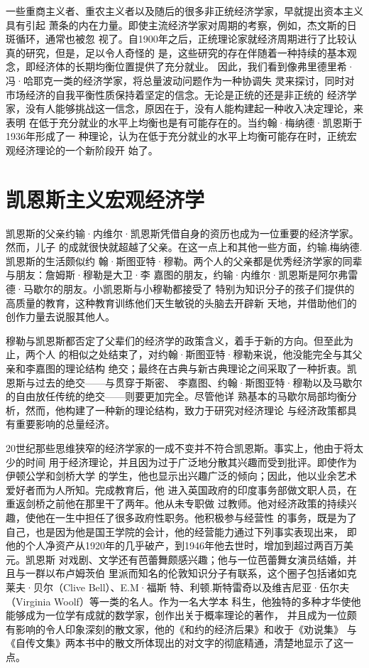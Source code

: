 一些重商主义者、重农主义者以及随后的很多非正统经济学家，早就提出资本主义具有引起
萧条的内在力量。即使主流经济学家对周期的考察，例如，杰文斯的日斑循环，通常也被忽
视了。自1900年之后，正统理论家就经济周期进行了比较认真的研究，但是，足以令人奇怪的
是，这些研究的存在伴随着一种持续的基本观念，即经济体的长期均衡位置提供了充分就业。
因此，我们看到像弗里德里希·冯·哈耶克一类的经济学家，将总量波动问题作为一种协调失
灵来探讨，同时对市场经济的自我平衡性质保持着坚定的信念。无论是正统的还是非正统的
经济学家，没有人能够挑战这一信念，原因在于，没有人能构建起一种收入决定理论，来表明
在低于充分就业的水平上均衡也是有可能存在的。当约翰·梅纳德·凯恩斯于1936年形成了一
种理论，认为在低于充分就业的水平上均衡可能存在时，正统宏观经济理论的一个新阶段开
始了。

\section{凯恩斯主义宏观经济学}

凯恩斯的父亲约输·内维尔·凯恩斯凭借自身的资历也成为一位重要的经济学家。然而，儿子
的成就很快就超越了父亲。在这一点上和其他一些方面，约输.梅纳德.凯恩斯的生活颇似约
翰·斯图亚特·穆勒。两个人的父亲都是优秀经济学家的同辈与朋友：詹姆斯·穆勒是大卫·李
嘉图的朋友，约输·内维尔·凯恩斯是阿尔弗雷德·马歇尔的朋友。小凯恩斯与小穆勒都接受了
特别为知识分子的孩子们提供的高质量的教育，这种教育训练他们天生敏锐的头脑去开辟新
天地，并借助他们的创作力量去说服其他人。

穆勒与凯恩斯都否定了父辈们的经济学的政策含义，着手于新的方向。但至此为止，两个人
的相似之处结束了，对约翰·斯图亚特·穆勒来说，他没能完全与其父亲和李嘉图的理论结构
绝交；最终在古典与新古典理论之间采取了一种折衷。凯恩斯与过去的绝交——与贯穿于斯密、
李嘉图、约翰·斯图亚特·穆勒以及马歇尔的自由放任传统的绝交——则要更加完全。尽管他详
熟基本的马歇尔局部均衡分析，然而，他构建了一种新的理论结构，致力于研究对经济理论
与经济政策都具有重要影响的总量经济。

20世纪那些思维狭窄的经济学家的一成不变并不符合凯恩斯。事实上，他由于将太少的时间
用于经济理论，并且因为过于广泛地分散其兴趣而受到批评。即使作为伊顿公学和剑桥大学
的学生，他也显示出兴趣广泛的倾向；因此，他以业余艺术爱好者而为人所知。完成教育后，他
进入英国政府的印度事务部做文职人员，在重返剑桥之前他在那里干了两年。他从未专职做
过教师。他对经济政策的持续兴趣，使他在一生中担任了很多政府性职务。他积极参与经营性
的事务，既是为了自己，也是因为他是国王学院的会计，他的经营能力通过下列事实表现出来，
即他的个人净资产从1920年的几乎破产，到1946年他去世时，增加到超过两百万美元。凯恩斯
对戏剧、文学还有芭蕾舞颇感兴趣；他与一位芭蕾舞女演员结婚，并且与一群以布卢姆茨伯
里派而知名的伦敦知识分子有联系，这个圈子包括诸如克莱夫·贝尔（Clive Bell）、E.M·福斯
特、利顿.斯特雷奇以及维吉尼亚·伍尔夫（Virginia Woolf）等一类的名人。作为一名大学本
科生，他独特的多种才华使他能够成为一位学有成就的数学家，创作出关于概率理论的著作，
并且成为一位颇有影响的令人印象深刻的散文家，他的《和约的经济后果》和收于《劝说集》
与《自传文集》两本书中的散文所体现出的对文字的彻底精通，清楚地显示了这一点。

